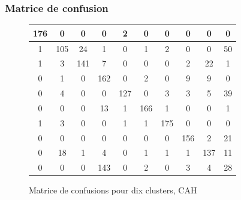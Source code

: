 \documentclass{article}
\begin{document}
    \subsubsection{Matrice de confusion}
    \begin{figure}[H]
        \centering
        \begin{tabular}{|c|c|c|c|c|c|c|c|c|c|}
            \hline
            176 & 0 & 0 & 0 & 2 & 0 & 0 & 0 & 0 & 0 \\
            \hline
            1 & 105 & 24 & 1 & 0 & 1 & 2 & 0 & 0 & 50\\
            \hline
            1 & 3 & 141 & 7 & 0 & 0 & 0 & 2 & 22 & 1\\
            \hline
            0 & 1 & 0 & 162 & 0 & 2 & 0 & 9 & 9 & 0\\
            \hline
            0 & 4 & 0 & 0 & 127 & 0 & 3 & 3 & 5 & 39\\
            \hline
            0 & 0 & 0 & 13 & 1 & 166 & 1 & 0 & 0 & 1\\
            \hline
            1 & 3 & 0 & 0 & 1 & 1 & 175 & 0 & 0 & 0 \\
            \hline
            0 & 0 & 0 & 0 & 0 & 0 & 0 & 156 & 2 & 21 \\
            \hline
            0 & 18 & 1 & 4 & 0 & 1 & 1 & 1 & 137 & 11 \\
            \hline
            0 & 0 & 0 & 143 & 0 & 2 & 0 & 3 & 4 & 28 \\
            \hline
        \end{tabular}
        \caption{Matrice de confusions pour dix clusters, CAH}    
    \end{figure}
\end{document}
